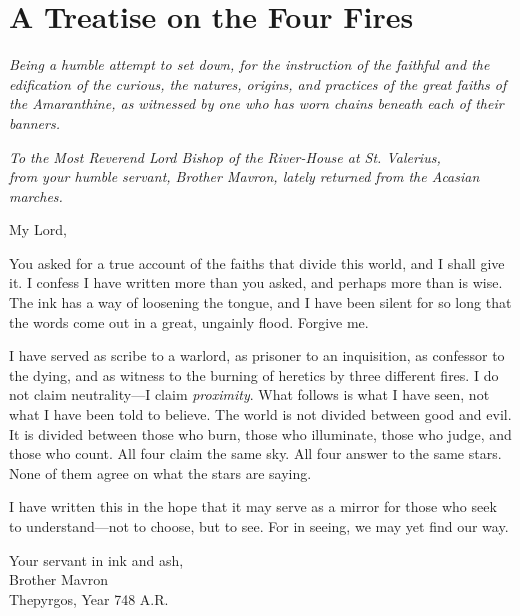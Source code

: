 \documentclass{book}
\begin{document}


\subtitle{Schism, Censure, and the War for the Soul of the Faithful}


\tableofcontents

\chapter*{A Treatise on the Four Fires}

\emph{Being a humble attempt to set down, for the instruction of the faithful and the edification of the curious, the natures, origins, and practices of the great faiths of the Amaranthine, as witnessed by one who has worn chains beneath each of their banners.}

\vspace{1em}

\noindent \textit{To the Most Reverend Lord Bishop of the River-House at St. Valerius,}
\\
\textit{from your humble servant, Brother Mavron, lately returned from the Acasian marches.}

\vspace{1em}

My Lord,

You asked for a true account of the faiths that divide this world, and I shall give it. I confess I have written more than you asked, and perhaps more than is wise. The ink has a way of loosening the tongue, and I have been silent for so long that the words come out in a great, ungainly flood. Forgive me.

I have served as scribe to a warlord, as prisoner to an inquisition, as confessor to the dying, and as witness to the burning of heretics by three different fires. I do not claim neutrality---I claim \textit{proximity}. What follows is what I have seen, not what I have been told to believe. The world is not divided between good and evil. It is divided between those who burn, those who illuminate, those who judge, and those who count. All four claim the same sky. All four answer to the same stars. None of them agree on what the stars are saying.

I have written this in the hope that it may serve as a mirror for those who seek to understand---not to choose, but to see. For in seeing, we may yet find our way.

\vspace{1em}

\noindent Your servant in ink and ash,\\
Brother Mavron\\
Thepyrgos, Year 748 A.R.
\end{document}

